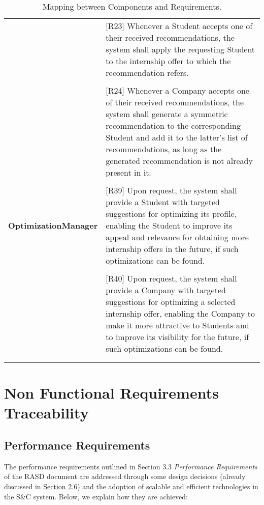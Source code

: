 \begin{center}
\begin{longtable}{p{0.3\linewidth}p{0.7\linewidth}}
        & [R23] Whenever a Student accepts one of their received recommendations, the system shall apply the requesting Student to the internship offer to which the recommendation refers. \\ \\
        & [R24] Whenever a Company accepts one of their received recommendations, the system shall generate a symmetric recommendation to the corresponding Student and add it to the latter’s list of recommendations, as long as the generated recommendation is not already present in it. \\ \\
        \hline
        \textbf{OptimizationManager}                      & [R39] Upon request, the system shall provide a Student with targeted suggestions for optimizing its profile, enabling the Student to improve its appeal and relevance for obtaining more internship offers in the future, if such optimizations can be found. \\ \\
        & [R40] Upon request, the system shall provide a Company with targeted suggestions for optimizing a selected internship offer, enabling the Company to make it more attractive to Students and to improve its visibility for the future, if such optimizations can be found. \\ \\
        \hline
        \caption{Mapping between Components and Requirements.}
        \label{tab: map_comp_req}
    \end{longtable}
\end{center}

\newpage

\section{Non Functional Requirements Traceability}
\label{sec: non_functional_requirements_traceability}

\subsection{Performance Requirements}
\label{subsec:performance_requirements}

The performance requirements outlined in Section 3.3 \textit{Performance Requirements} of the RASD document are addressed through some design decisions (already discussed in \hyperref[sec: patterns]{\uline{Section 2.6}}) and the adoption of scalable and efficient technologies in the S\&C system. Below, we explain how they are achieved:

